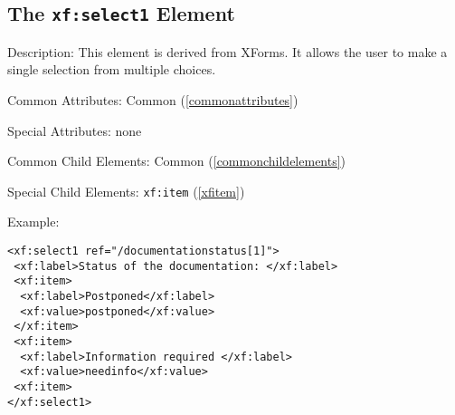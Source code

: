 \subsection{ The \texttt{xf:select1} Element}
\label{xfselect1}
\begin{description}
 \item Description: This element is derived from XForms. It allows the user to make a single selection from multiple choices.

 \item Common Attributes: Common (\ref{commonattributes})

 \item Special Attributes: none

 \item Common Child Elements: Common (\ref{commonchildelements})

 \item Special Child Elements: \texttt{xf:item} (\ref{xfitem})

 \item Example: 

\begin{lstlisting}[caption=\texttt{xf:select1} Element]
<xf:select1 ref="/documentationstatus[1]">
 <xf:label>Status of the documentation: </xf:label>
 <xf:item>
  <xf:label>Postponed</xf:label>
  <xf:value>postponed</xf:value>
 </xf:item>
 <xf:item>
  <xf:label>Information required </xf:label>
  <xf:value>needinfo</xf:value>
 <xf:item>
</xf:select1>
\end{lstlisting}
\end{description}













